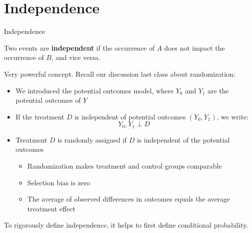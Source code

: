 \documentclass[compress, 8pt]{beamer}
\begin{document}
\section{Independence}
\miniframesoff
\begin{frame}
    \tableofcontents[currentsection]
\end{frame}
\miniframeson


\begin{frame}{Independence}

Two events are \textbf{independent} if the occurrence of $A$ does not impact the occurrence of $B$, and vice versa.

\vspace{3ex}
Very powerful concept. Recall our discussion last class about randomization:
\begin{itemize}
    \item We introduced the potential outcomes model, where $Y_0$ and $Y_1$ are the potential outcomes of $Y$
    \item If the treatment $D$ is independent of potential outcomes $(Y_0, Y_1)$, we write:
    \begin{equation*}
        Y_0, Y_1 \perp D
    \end{equation*}
    \item Treatment $D$ is randomly assigned if $D$ is independent of the potential outcomes
    \begin{itemize}
        \item[$\implies$] Randomization makes treatment and control groups comparable
        \item[$\implies$] Selection bias is zero
        \item[$\implies$] The average of observed differences in outcomes equals the average treatment effect
    \end{itemize}
\end{itemize}

\vspace{3ex}
To rigorously define independence, it helps to first define conditional probability. 

\end{frame}
\end{document}
